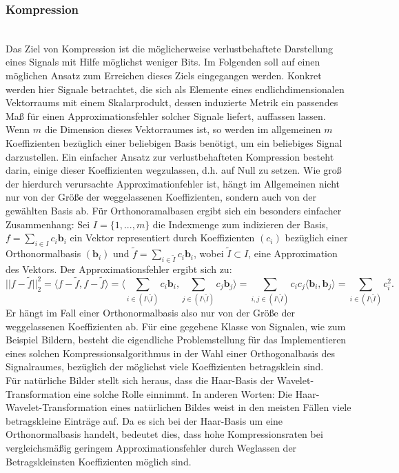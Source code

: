 \subsubsection{Kompression}~\\
Das Ziel von Kompression ist die möglicherweise verlustbehaftete Darstellung eines Signals mit Hilfe möglichst weniger Bits. Im Folgenden soll auf einen möglichen Ansatz zum Erreichen dieses Ziels eingegangen werden.
Konkret werden hier Signale betrachtet, die sich als Elemente eines endlichdimensionalen Vektorraums mit einem Skalarprodukt, dessen induzierte Metrik ein passendes Maß für einen Approximationsfehler solcher Signale liefert, auffassen lassen. Wenn $m$ die Dimension dieses Vektorraumes ist, so werden im allgemeinen $m$ Koeffizienten bezüglich einer beliebigen Basis benötigt, um ein beliebiges Signal darzustellen. Ein einfacher Ansatz zur verlustbehafteten Kompression besteht darin, einige dieser Koeffizienten wegzulassen, d.h. auf Null zu setzen. Wie groß der hierdurch verursachte Approximationfehler ist, hängt im Allgemeinen nicht nur von der Größe der weggelassenen Koeffizienten, sondern auch von der gewählten Basis ab. Für Orthonoramalbasen ergibt sich ein besonders einfacher Zusammenhang: Sei $I=\{1,...,m\}$ die Indexmenge zum indizieren der Basis, $f=\sum_{i \in I} c_i \mathbf{b}_i$ ein Vektor representiert durch Koeffizienten $(c_i)$ bezüglich einer Orthonormalbasis $(\mathbf{b}_i)$ und $\tilde{f}=\sum_{i \in \tilde{I}} c_i \mathbf{b}_i$, wobei $\tilde{I} \subset I$, eine Approximation des Vektors. Der Approximationsfehler ergibt sich zu:
%
\[
||f-\tilde{f}||_2^2 
= \langle f-\tilde{f}, f-\tilde{f} \rangle 
= \langle \sum_{i \in (I \setminus \tilde{I})} c_i \mathbf{b}_i , \sum_{j \in (I \setminus \tilde{I})} c_j \mathbf{b}_j \rangle 
= \sum_{i,j \in (I \setminus \tilde{I})} c_i c_j \langle \mathbf{b}_i , \mathbf{b}_j \rangle 
= \sum_{i \in (I \setminus \tilde{I})} c_i^2
.
\]
%
Er hängt im Fall einer Orthonormalbasis also nur von der Größe der weggelassenen Koeffizienten ab. Für eine gegebene Klasse von Signalen, wie zum Beispiel Bildern, besteht die eigendliche Problemstellung für das Implementieren eines solchen Kompressionsalgorithmus in der Wahl einer Orthogonalbasis des Signalraumes, bezüglich der möglichst viele Koeffizienten betragsklein sind.\\
Für natürliche Bilder stellt sich heraus, dass die Haar-Basis der Wavelet-Transformation eine solche Rolle einnimmt. In anderen Worten: Die Haar-Wavelet-Transformation eines natürlichen Bildes weist in den meisten Fällen viele betragskleine Einträge auf. Da es sich bei der Haar-Basis um eine Orthonormalbasis handelt, bedeutet dies, dass hohe Kompressionsraten bei vergleichsmäßig geringem Approximationsfehler durch Weglassen der Betragskleinsten Koeffizienten möglich sind. \\
